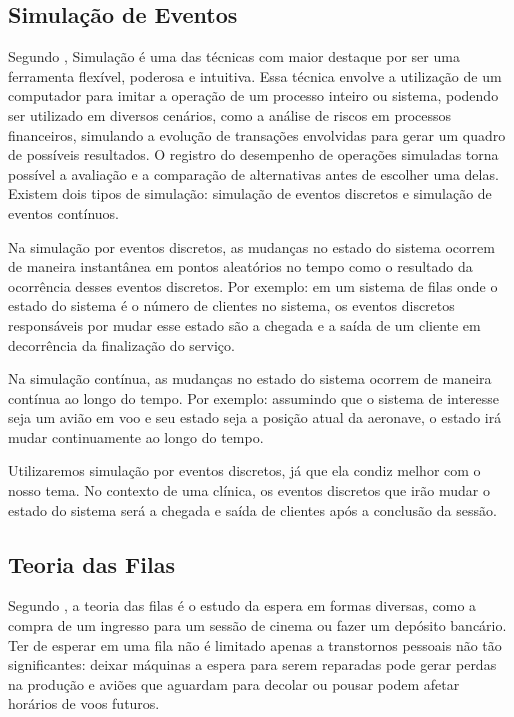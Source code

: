 \documentclass[
    12pt,                %
    openright,           %
    oneside,             %
    a4paper,             %
    english,             %
    brazil               %
]{abntex2}
\begin{document}
\subsection{Simulação de Eventos}

Segundo , Simulação é uma das técnicas com maior destaque por ser uma ferramenta flexível, poderosa e intuitiva. Essa técnica envolve a utilização de um computador para imitar a operação de um processo inteiro ou sistema, podendo ser utilizado em diversos cenários, como a análise de riscos em processos financeiros, simulando a evolução de transações envolvidas para gerar um quadro de possíveis resultados. O registro do desempenho de operações simuladas torna possível  a avaliação e a comparação de alternativas antes de escolher uma delas. Existem dois tipos de simulação: simulação de eventos discretos e simulação de eventos contínuos.

Na simulação por eventos discretos, as mudanças no estado do sistema ocorrem de maneira instantânea em pontos aleatórios no tempo como o resultado da ocorrência desses eventos discretos. Por exemplo: em um sistema de filas onde o estado do sistema é o número de clientes no sistema, os eventos discretos responsáveis por mudar esse estado são a chegada e a saída de um cliente em decorrência da finalização do serviço.

Na simulação contínua, as mudanças no estado do sistema ocorrem de maneira contínua ao longo do tempo. Por exemplo: assumindo que o sistema de interesse seja um avião em voo e seu estado seja a posição atual da aeronave, o estado irá mudar continuamente ao longo do tempo.

Utilizaremos simulação por eventos discretos, já que ela condiz melhor com o nosso tema. No contexto de uma clínica, os eventos discretos que irão mudar o estado do sistema será a chegada e saída de clientes após a conclusão da sessão.

\subsection{Teoria das Filas}

Segundo , a teoria das filas é o estudo da espera em formas diversas, como a compra de um ingresso para um sessão de cinema ou fazer um depósito bancário. Ter de esperar em uma fila não é limitado apenas a transtornos pessoais não tão significantes: deixar máquinas a espera para serem reparadas pode gerar perdas na produção e aviões que aguardam para decolar ou pousar podem afetar horários de voos futuros.
\end{document}

